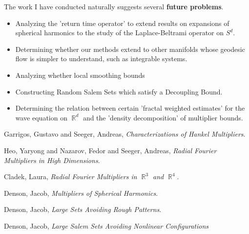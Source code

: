 \documentclass[12pt]{article}
\DeclareMathOperator{\RR}{\mathbb{R}}
\begin{document}
The work I have conducted naturally suggests several {\bf future problems}.
%
\begin{itemize}
	\item Analyzing the 'return time operator' to extend results on expansions of spherical harmonics to the study of the Laplace-Beltrami operator on $S^d$.

	\item Determining whether our methods extend to other manifolds whose geodesic flow is simpler to understand, such as integrable systems.

	\item Analyzing whether local smoothing bounds

	\item Constructing Random Salem Sets which satisfy a Decoupling Bound.

	\item Determining the relation between certain 'fractal weighted estimates' for the wave equation on $\RR^d$ and the 'density decomposition' of multiplier bounds.
\end{itemize}

\begin{thebibliography}{03}

 Garrigos, Gustavo and Seeger, Andreas,
	\emph{Characterizations of {H}ankel Multipliers}.

 Heo, Yaryong and Nazarov, Fedor and Seeger, Andreas,
	\emph{Radial {F}ourier Multipliers in High Dimensions}.

 Cladek, Laura,
	\emph{Radial {F}ourier Multipliers in $\RR^3$ and $\RR^4$}.

 Denson, Jacob,
	\emph{Multipliers of Spherical Harmonics}.

 Denson, Jacob,
 	\emph{Large Sets Avoiding Rough Patterns}.

 Denson, Jacob,
	\emph{Large Salem Sets Avoiding Nonlinear Configurations}

\end{thebibliography}
\end{document}
